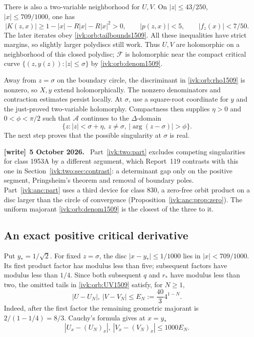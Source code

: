\documentclass[11pt,letterpaper]{article}
\theoremstyle{remark}\newtheorem{remark}[theorem]{Remark}
\newenvironment{writenote}[1][]{\par\smallskip\begingroup\small
 \noindent\textbf{[write]}\if\relax\detokenize{#1}\relax\else~\textbf{#1.}\fi\ }%
 {\par\endgroup\smallskip}
\begin{document}
There is also a two-variable neighborhood for $U,V$. On
$|z|\le43/250$, $|x|\le709/1000$, one has
\[
|K(z,x)|\ge1-|x|-R|x|-R|x|^2>0,\qquad |p(z,x)|<5,
\qquad |f_z(x)|<7/50.
\]
The later iterates obey \eqref{ivk:orb:tailbounds1509}. All these inequalities
have strict margins, so slightly larger polydiscs still work.
Thus $U,V$ are holomorphic on a neighborhood of this closed polydisc;
$\mathcal F$ is holomorphic near the compact critical curve
$\{(z,y(z)):|z|\le\sigma\}$ by \eqref{ivk:orb:denom1509}.

Away from $z=\sigma$ on the boundary circle, the discriminant in
\eqref{ivk:orb:rho1509} is nonzero, so $X,y$ extend holomorphically. The
nonzero denominators and contraction estimates persist locally.
At $\sigma$, use a square-root coordinate for $y$ and the just-proved
two-variable holomorphy. Compactness then supplies $\eta>0$ and
$0<\phi<\pi/2$ such that $\mathcal A$ continues to the $\Delta$-domain
\begin{equation}\label{ivk:orb:delta1509}
\{z:|z|<\sigma+\eta,\ z\ne\sigma,\ |\arg(z-\sigma)|>\phi\}.
\end{equation}
The next step proves that the possible singularity at $\sigma$ is real.
\begin{writenote}[5 October 2026]
Part~\ref{ivk:two:part} excludes competing singularities for class 1953A by a different argument, which Report~119 contrasts with this one in Section~\ref{ivk:two:sec:contrast}: a determinant gap only on the positive segment, Pringsheim's theorem and removal of boundary poles. Part~\ref{ivk:anc:part} uses a third device for class 830, a zero-free orbit product on a disc larger than the circle of convergence (Proposition~\ref{ivk:anc:prop:zero}). The uniform majorant \eqref{ivk:orb:denom1509} is the closest of the three to it.
\end{writenote}


\subsection{An exact positive critical derivative}
Put $y_*=1/\sqrt2$. For fixed $z=\sigma$, the disc
$|x-y_*|\le1/1000$ lies in $|x|<709/1000$. Its first product factor
has modulus less than five; subsequent factors have modulus less than
$1/4$. Since both subsequent $q$ and $r_*$ have modulus less than two,
the omitted tails in \eqref{ivk:orb:UV1509} satisfy, for $N\ge1$,
\begin{equation}\label{ivk:orb:UVtail1509}
|U-U_N|,\ |V-V_N|\le E_N:=\frac{40}{3}4^{1-N}.
\end{equation}
Indeed, after the first factor the remaining geometric majorant is
$2/(1-1/4)=8/3$. Cauchy's formula gives at $x=y_*$
\begin{equation}\label{ivk:orb:UVderiv1509}
|U_x-(U_N)_x|,\ |V_x-(V_N)_x|\le1000E_N.
\end{equation}
\end{document}
